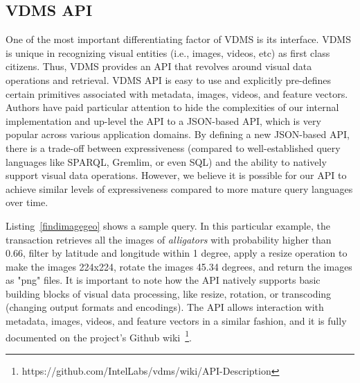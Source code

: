 \subsection{VDMS API}

One of the most important differentiating factor of VDMS is its interface.
VDMS is unique in recognizing visual entities (i.e., images, videos, etc)
as first class citizens. Thus, VDMS provides an API that revolves
around visual data operations and retrieval.
VDMS API is easy to use and explicitly pre-defines certain
primitives associated with metadata, images, videos, and feature vectors.
Authors have paid particular attention to hide the complexities of our internal
implementation and up-level the API to a JSON-based API,
which is very popular across various application domains.
By defining a new JSON-based API, there is a trade-off between expressiveness
(compared to well-established query languages like SPARQL, Gremlim, or even SQL)
and the ability to natively support visual data operations.
However, we believe it is possible for our API to achieve similar levels of
expressiveness compared to more mature query languages over time.

Listing~\ref{findimagegeo} shows a sample query.
In this particular example, the transaction retrieves
all the images of \textit{alligators}
with probability higher than 0.66,
filter by latitude and longitude within 1 degree,
apply a resize operation to make the images 224x224,
rotate the images 45.34 degrees,
and return the images as "png" files.
It is important to note how the API natively supports basic building
blocks of visual data processing, like resize, rotation, or transcoding
(changing output formats and encodings).
The API allows interaction with metadata, images, videos,
and feature vectors in a similar fashion, and it is fully
documented on the project's Github
wiki~\footnote{https://github.com/IntelLabs/vdms/wiki/API-Description}.

